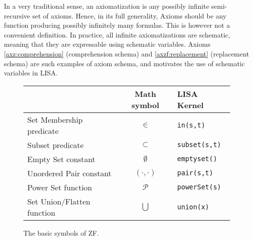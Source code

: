 In a very traditional sense, an axiomatization is any possibly infinite semi-recursive set of axioms. Hence, in its full generality, Axioms should be any function producing possibly infinitely many formulas.
This is however not a convenient definition. In practice, all infinite axiomatizations are schematic, meaning that they are expressable using schematic variables. Axioms \ref{axz:comprehension} (comprehension schema) and \ref{axzf:replacement} (replacement schema) are such examples of axiom schema, and motivates the use of schematic variables in LISA.



\begin{figure}
  \begin{center}
    \begin{tabular}{l|c|l}
      {}                         & Math symbol       & LISA Kernel             \\ \hline
      Set Membership predicate   & $\in$             & \lstinline$in(s,t)$     \\
      Subset predicate           & $\subset$         & \lstinline$subset(s,t)$ \\
      Empty Set constant         & $\emptyset$       & \lstinline$emptyset()$  \\
      Unordered Pair constant    & $(\cdot, \cdot )$ & \lstinline$pair(s,t)$   \\
      Power Set function         & $\mathcal P$      & \lstinline$powerSet(s)$ \\
      Set Union/Flatten function & $\bigcup$         & \lstinline$union(x)$    \\
    \end{tabular}

    \caption{The basic symbols of ZF.}
    \label{fig:symbolszf}
  \end{center}
\end{figure}


